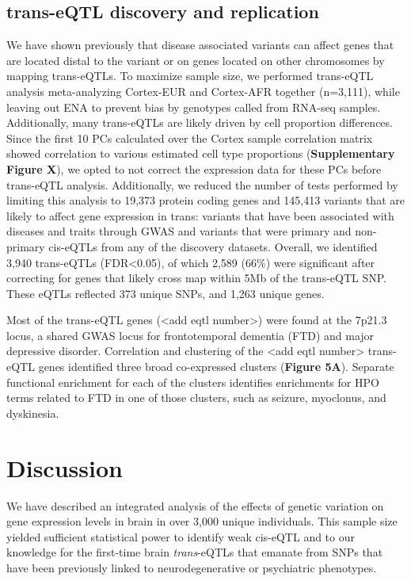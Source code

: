 \subsection{trans-eQTL discovery and replication}
We have shown previously that disease associated variants can affect genes that are located distal to the variant or on genes located on other chromosomes by mapping trans-eQTLs. To maximize sample size, we performed trans-eQTL analysis meta-analyzing Cortex-EUR and Cortex-AFR together (n=3,111), while leaving out ENA to prevent bias by genotypes called from RNA-seq samples. Additionally, many trans-eQTLs are likely driven by cell proportion differences. Since the first 10 PCs calculated over the Cortex sample correlation matrix showed correlation to various estimated cell type proportions (\textbf{Supplementary Figure X}), we opted to not correct the expression data for these PCs before trans-eQTL analysis. Additionally, we reduced the number of tests performed by limiting this analysis to 19,373 protein coding genes and 145,413 variants that are likely to affect gene expression in trans: variants that have been associated with diseases and traits through GWAS and variants that were primary and non-primary cis-eQTLs from any of the discovery datasets. Overall, we identified 3,940 trans-eQTLs (FDR<0.05), of which 2,589 (66\%) were significant after correcting for genes that likely cross map within 5Mb of the trans-eQTL SNP. These eQTLs reflected 373 unique SNPs, and 1,263 unique genes.  

Most of the trans-eQTL genes (<add eqtl number>) were found at the 7p21.3 locus, a shared GWAS locus for frontotemporal dementia (FTD) and major depressive disorder. Correlation and clustering of the <add eqtl number> trans-eQTL genes identified three broad co-expressed clusters (\textbf{Figure 5A}). Separate functional enrichment for each of the clusters identifies enrichments for HPO terms related to FTD in one of those clusters, such as seizure, myoclonus, and dyskinesia.  



\section{Discussion}

We have described an integrated analysis of the effects of genetic variation on gene expression levels in brain in over 3,000 unique individuals. This sample size yielded sufficient statistical power to identify weak cis-eQTL and to our knowledge for the first-time brain \emph{trans}-eQTLs that emanate from SNPs that have been previously linked to neurodegenerative or psychiatric phenotypes. 

